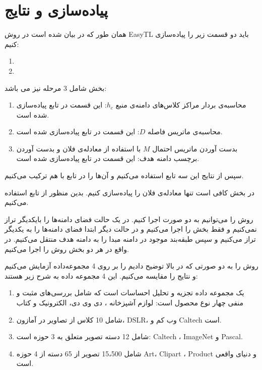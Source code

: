 	\section{پیاده‌سازی و نتایج}

همان طور که در 
\cite{wang2019easy}
بیان شده است در روش 
EasyTL
باید دو قسمت زیر را پیاده‌سازی کنیم:
\begin{enumerate}
	\item{}
	\item {}
\end{enumerate}

بخش 
شامل 3 مرحله نیز می باشد:
\begin{enumerate}
	\item{	
		محاسبه‌ی بردار مراکز کلاس‌های دامنه‌ی منبع $h_c$: این قسمت در تابع 
		پیاده‌سازی شده است.}
	\item{
		محاسبه‌ی ماتریس فاصله $D$: این قسمت در تابع 
		پیاده‌سازی شده است.}
	\item{
		بدست آوردن ماتریس احتمال $M$ با استفاده از معادله‌ی فلان و بدست آوردن برچسب دامنه هدف: این قسمت در تابع 
	پیاده‌سازی شده است.}  
\end{enumerate}

سپس از نتایج این سه تابع استفاده می‌کنیم و آن‌ها را در تابع 
با هم ترکیب می‌کنیم.

در بخش 
کافی است تنها معادله‌ی فلان را پیاده‌سازی کنیم. بدین منظور از تابع 
استفاده می‌کنیم.

روش
را می‌توانیم به دو صورت اجرا کنیم. در یک حالت فضای دامنه‌ها را بایکدیگر تراز نمی‌کنیم و فقط بخش 
را اجرا می‌کنیم و در حالت دیگر ابتدا فضای دامنه‌ها را به یکدیگر تراز می‌کنیم و سپس طبقه‌بند موجود در دامنه مبدا را به دامنه هدف منتقل می‌کنیم. در واقع در هر دو بخش روش 
را اجرا می‌کنیم. 

روش 
را به دو صورتی که در بالا توضیح دادیم را بر روی 4 مجموعه‌داده آزمایش می‌کنیم و نتایج را مقایسه می‌کنیم. این 4 مجموعه داده به شرح زیر هستند:
\begin{enumerate}
	\item {
		یک مجموعه داده تجزیه و تحلیل احساسات است که شامل بررسی‌های مثبت و منفی چهار نوع محصول است: لوازم آشپزخانه ، دی وی دی، الکترونیک و کتاب}

	\item{
		شامل 10 کلاس از تصاویر در آمازون، DSLR، وب کم و Caltech است.
	}
	\item {
		شامل 12 دسته تصویر متعلق به 3 حوزه است: Caltech ، ImageNet  و Pascal.
	}

	\item {
		شامل 15،500 تصویر از 65 دسته از 4 حوزه Art، Clipart ، Product و دنیای واقعی است.
	}
\end{enumerate}

